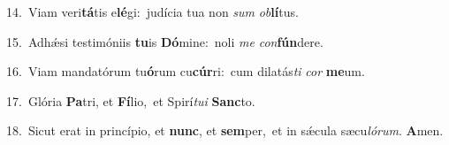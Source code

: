 {\numbfont\textcolor{\numbcolor}{14.}}~Viam veri\-\textbf{tá}\-tis e\-\textbf{lé}\-gi:~\star judícia tua non \textit{sum} \textit{ob}\-\textbf{lí}tus.\par
{\numbfont\textcolor{\numbcolor}{15.}}~Adhǽsi testimóniis \textbf{tu}\-is \textbf{Dó}\-mine:~\star noli \textit{me} \textit{con}\-\textbf{fún}dere.\par
{\numbfont\textcolor{\numbcolor}{16.}}~Viam mandatórum tu\-\textbf{ó}\-rum cu\-\textbf{cúr}\-ri:~\star cum dilatás\textit{ti} \textit{cor} \textbf{me}\-um.\par
{\numbfont\textcolor{\numbcolor}{17.}}~Glória \textbf{Pa}\-tri, et \textbf{Fí}\-lio,~\star et Spirí\-\textit{tu}\-\textit{i} \textbf{Sanc}\-to.\par
{\numbfont\textcolor{\numbcolor}{18.}}~Sicut erat in princípio, et \textbf{nunc}\-, et \textbf{sem}\-per,~\star et in sǽcula sæcu\-\textit{ló}\-\textit{rum}. \textbf{A}\-men.\par
